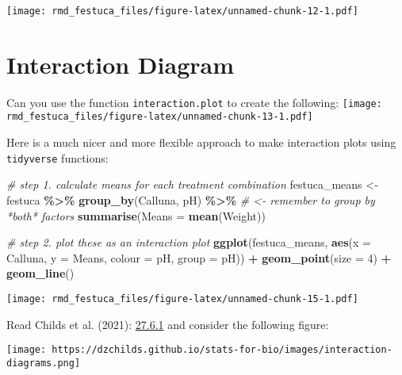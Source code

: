 \documentclass[
]{article}
\newenvironment{Shaded}{\begin{snugshade}}{\end{snugshade}}
\newcommand{\AttributeTok}[1]{\textcolor[rgb]{0.13,0.29,0.53}{#1}}
\newcommand{\CommentTok}[1]{\textcolor[rgb]{0.56,0.35,0.01}{\textit{#1}}}
\newcommand{\DecValTok}[1]{\textcolor[rgb]{0.00,0.00,0.81}{#1}}
\newcommand{\FunctionTok}[1]{\textcolor[rgb]{0.13,0.29,0.53}{\textbf{#1}}}
\newcommand{\NormalTok}[1]{#1}
\newcommand{\OtherTok}[1]{\textcolor[rgb]{0.56,0.35,0.01}{#1}}
\newcommand{\SpecialCharTok}[1]{\textcolor[rgb]{0.81,0.36,0.00}{\textbf{#1}}}
\begin{document}
\texttt{[image: rmd\_festuca\_files/figure-latex/unnamed-chunk-12-1.pdf]}

\hypertarget{interaction-diagram}{%
\section{Interaction Diagram}\label{interaction-diagram}}

Can you use the function \texttt{interaction.plot} to create the
following:
\texttt{[image: rmd\_festuca\_files/figure-latex/unnamed-chunk-13-1.pdf]}

Here is a much nicer and more flexible approach to make interaction
plots using \texttt{tidyverse} functions:

\begin{Shaded}
\begin{Highlighting}[]
\CommentTok{\# step 1. calculate means for each treatment combination}
\NormalTok{festuca\_means }\OtherTok{\textless{}{-}} 
\NormalTok{  festuca }\SpecialCharTok{\%\textgreater{}\%} 
  \FunctionTok{group\_by}\NormalTok{(Calluna, pH) }\SpecialCharTok{\%\textgreater{}\%} \CommentTok{\# \textless{}{-} remember to group by *both* factors}
  \FunctionTok{summarise}\NormalTok{(}\AttributeTok{Means =} \FunctionTok{mean}\NormalTok{(Weight))}
\end{Highlighting}
\end{Shaded}

\begin{Shaded}
\begin{Highlighting}[]
\CommentTok{\# step 2. plot these as an interaction plot}
\FunctionTok{ggplot}\NormalTok{(festuca\_means, }
       \FunctionTok{aes}\NormalTok{(}\AttributeTok{x =}\NormalTok{ Calluna, }\AttributeTok{y =}\NormalTok{ Means, }\AttributeTok{colour =}\NormalTok{ pH, }\AttributeTok{group =}\NormalTok{ pH)) }\SpecialCharTok{+}
  \FunctionTok{geom\_point}\NormalTok{(}\AttributeTok{size =} \DecValTok{4}\NormalTok{) }\SpecialCharTok{+} \FunctionTok{geom\_line}\NormalTok{()}
\end{Highlighting}
\end{Shaded}

\texttt{[image: rmd\_festuca\_files/figure-latex/unnamed-chunk-15-1.pdf]}

Read Childs et al. (2021):
\href{https://dzchilds.github.io/stats-for-bio/two-way-anova-in-r.html\#understanding-the-model-graphically}{27.6.1}
and consider the following figure:

\texttt{[image: https://dzchilds.github.io/stats-for-bio/images/interaction-diagrams.png]}
\end{document}
